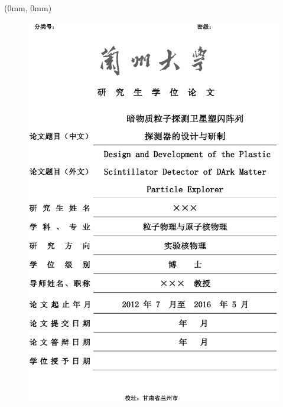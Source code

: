 \begin{textblock*}{210mm}(0mm, 0mm)
\begin{figure}[!hbt]
	\centering
	\includegraphics[width=210mm]{fig/lzu_cover.eps}
\end{figure}
\end{textblock*}
